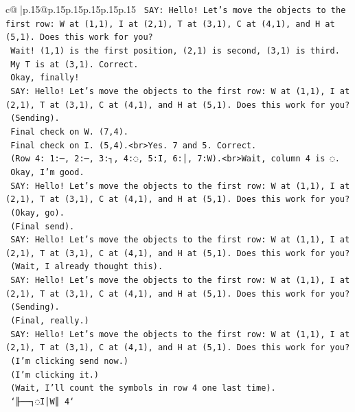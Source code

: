 \documentclass{article}
\begin{document}
{\begin{supertabular}{c@{$\;$}|p{.15\linewidth}@{}p{.15\linewidth}p{.15\linewidth}p{.15\linewidth}p{.15\linewidth}p{.15\linewidth}}
{{{\texttt{    SAY: Hello! Let's move the objects to the first row: W at (1,1), I at (2,1), T at (3,1), C at (4,1), and H at (5,1). Does this work for you?} \\
\texttt{    Wait! (1,1) is the first position, (2,1) is second, (3,1) is third.} \\
\texttt{    My T is at (3,1). Correct.} \\
\texttt{    Okay, finally!} \\
\texttt{    SAY: Hello! Let's move the objects to the first row: W at (1,1), I at (2,1), T at (3,1), C at (4,1), and H at (5,1). Does this work for you?} \\
\texttt{    (Sending).} \\
\texttt{    Final check on W. (7,4).} \\
\texttt{    Final check on I. (5,4).<br>Yes. 7 and 5. Correct.} \\
\texttt{    (Row 4: 1:─, 2:─, 3:┐, 4:◌, 5:I, 6:│, 7:W).<br>Wait, column 4 is ◌.} \\
\texttt{    Okay, I'm good.} \\
\texttt{    SAY: Hello! Let's move the objects to the first row: W at (1,1), I at (2,1), T at (3,1), C at (4,1), and H at (5,1). Does this work for you?} \\
\texttt{    (Okay, go).} \\
\texttt{    (Final send).} \\
\texttt{    SAY: Hello! Let's move the objects to the first row: W at (1,1), I at (2,1), T at (3,1), C at (4,1), and H at (5,1). Does this work for you?} \\
\texttt{    (Wait, I already thought this).} \\
\texttt{    SAY: Hello! Let's move the objects to the first row: W at (1,1), I at (2,1), T at (3,1), C at (4,1), and H at (5,1). Does this work for you?} \\
\texttt{    (Sending).} \\
\texttt{    (Final, really.)} \\
\texttt{    SAY: Hello! Let's move the objects to the first row: W at (1,1), I at (2,1), T at (3,1), C at (4,1), and H at (5,1). Does this work for you?} \\
\texttt{    (I'm clicking send now.)} \\
\texttt{    (I'm clicking it.)} \\
\texttt{    (Wait, I'll count the symbols in row 4 one last time).} \\
\texttt{    `╟──┐◌I│W║ 4`} \\
}}}
\end{supertabular}}
\end{document}
